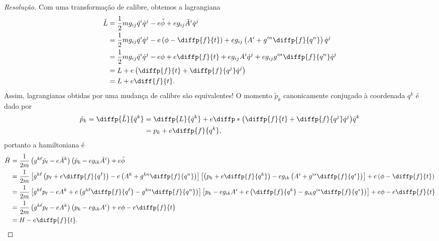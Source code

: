 \begin{proof}[Resolução]
    Com uma transformação de calibre, obtemos a lagrangiana
    \begin{align*}
        \tilde{L} &= \frac12 mg_{ij}\dot{q}^i\dot{q}^j -e\tilde{\phi} + eg_{ij}\tilde{A}^i\dot{q}^j\\
                  &= \frac12 mg_{ij}\dot{q}^i\dot{q}^j -e\left(\phi - \diffp{f}{t}\right) + eg_{ij}\left(A^i + g^{in}\diffp{f}{q^n}\right)\dot{q}^j\\
                  &= \frac12 mg_{ij}\dot{q}^i\dot{q}^j -e\phi + e\diffp{f}{t} + eg_{ij}A^i\dot{q}^j + eg_{ij}g^{in}\diffp{f}{q^n}\dot{q}^j\\
                  &= L + e\left(\diffp{f}{t} + \diffp{f}{q^j}\dot{q}^j\right)\\
                  &= L + e \diff{f}{t}.
    \end{align*}
    Assim, lagrangianas obtidas por uma mudança de calibre são equivalentes! O momento \(\tilde{p}_k\) canonicamente conjugado à coordenada \(q^k\) é dado por
    \begin{align*}
        \tilde{p}_k = \diffp{\tilde{L}}{\dot{q}^k} &= \diffp{L}{\dot{q}^k} + e \diffp*{\left(\diffp{f}{t} + \diffp{f}{q^j}\dot{q}^j\right)}{\dot{q}^k}\\
                                                   &= p_k + e\diffp{f}{q^k},
    \end{align*}
    portanto a hamiltoniana é
    \begin{align*}
        \tilde{H} &= \frac1{2m} \left(g^{k\ell}\tilde{p}_\ell - e\tilde{A}^k\right)\left(\tilde{p}_k - e g_{ik}\tilde{A}^i\right) + e\tilde{\phi}\\
                  &=\frac1{2m} \left[g^{k\ell}\left(p_\ell + e \diffp{f}{q^\ell}\right)- e\left(A^k + g^{kn}\diffp{f}{q^n}\right)\right]\left[\left(p_k + e \diffp{f}{q^k}\right)- e g_{ik}\left(A^i + g^{is}\diffp{f}{q^s}\right)\right] + e\left(\phi - \diffp{f}{t}\right)\\
                  &= \frac{1}{2m} \left[g^{k\ell}p_\ell - eA^k + e\left(g^{k\ell}\diffp{f}{q^\ell} - g^{kn}\diffp{f}{q^n}\right)\right]\left[p_k - eg_{ik}A^i + e\left(\diffp{f}{q^k} - g_{ik}g^{is}\diffp{f}{q^s}\right)\right] + e\phi - e\diffp{f}{t}\\
                  &= \frac1{2m} \left(g^{k\ell}p_\ell - eA^k\right)\left(p_k - e g_{ik}A^i\right) + e\phi - e\diffp{f}{t}\\
                  &= H - e\diffp{f}{t}.
    \end{align*}
\end{proof}
